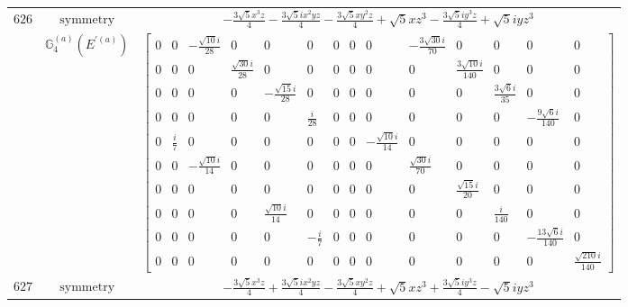 \documentclass[fleqn,8pt,landscape]{jsarticle}
\begin{document}
\begin{longtable}{ccc}
$ 626 $ & $ \text{symmetry} $ & $ - \frac{3 \sqrt{5} x^{3} z}{4} - \frac{3 \sqrt{5} i x^{2} y z}{4} - \frac{3 \sqrt{5} x y^{2} z}{4} + \sqrt{5} x z^{3} - \frac{3 \sqrt{5} i y^{3} z}{4} + \sqrt{5} i y z^{3} $ \\
$  $ & $ \mathbb{G}_{4}^{(a)}(E^{\prime(a)}) $ & $ \begin{bmatrix} 0 & 0 & - \frac{\sqrt{10} i}{28} & 0 & 0 & 0 & 0 & 0 & 0 & - \frac{3 \sqrt{30} i}{70} & 0 & 0 & 0 & 0 \\ 0 & 0 & 0 & \frac{\sqrt{30} i}{28} & 0 & 0 & 0 & 0 & 0 & 0 & \frac{3 \sqrt{10} i}{140} & 0 & 0 & 0 \\ 0 & 0 & 0 & 0 & - \frac{\sqrt{15} i}{28} & 0 & 0 & 0 & 0 & 0 & 0 & \frac{3 \sqrt{6} i}{35} & 0 & 0 \\ 0 & 0 & 0 & 0 & 0 & \frac{i}{28} & 0 & 0 & 0 & 0 & 0 & 0 & - \frac{9 \sqrt{6} i}{140} & 0 \\ 0 & \frac{i}{7} & 0 & 0 & 0 & 0 & 0 & 0 & - \frac{\sqrt{10} i}{14} & 0 & 0 & 0 & 0 & 0 \\ 0 & 0 & - \frac{\sqrt{10} i}{14} & 0 & 0 & 0 & 0 & 0 & 0 & \frac{\sqrt{30} i}{70} & 0 & 0 & 0 & 0 \\ 0 & 0 & 0 & 0 & 0 & 0 & 0 & 0 & 0 & 0 & \frac{\sqrt{15} i}{20} & 0 & 0 & 0 \\ 0 & 0 & 0 & 0 & \frac{\sqrt{10} i}{14} & 0 & 0 & 0 & 0 & 0 & 0 & \frac{i}{140} & 0 & 0 \\ 0 & 0 & 0 & 0 & 0 & - \frac{i}{7} & 0 & 0 & 0 & 0 & 0 & 0 & - \frac{13 \sqrt{6} i}{140} & 0 \\ 0 & 0 & 0 & 0 & 0 & 0 & 0 & 0 & 0 & 0 & 0 & 0 & 0 & \frac{\sqrt{210} i}{140} \end{bmatrix} $ \\ \hline
$ 627 $ & $ \text{symmetry} $ & $ - \frac{3 \sqrt{5} x^{3} z}{4} + \frac{3 \sqrt{5} i x^{2} y z}{4} - \frac{3 \sqrt{5} x y^{2} z}{4} + \sqrt{5} x z^{3} + \frac{3 \sqrt{5} i y^{3} z}{4} - \sqrt{5} i y z^{3} $ \\

\end{longtable}
\end{document}
